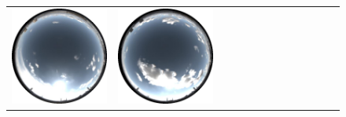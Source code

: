 \begin{figure}[!ht]
\begin{tabular}{@{}rcccccccccccc@{}}
    \includegraphics[width=\customwidth]{./figures/reconstruction/envmaps/20141011_122929.jpg} &
    \includegraphics[width=\customwidth]{./figures/reconstruction/envmaps/20141011_130128.jpg} &

\end{tabular}
\end{figure}

